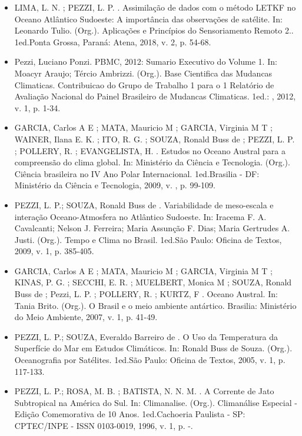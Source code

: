 \documentclass[11pt, a4paper]{awesome-cv}
\begin{document}
\begin{cvletter}

\begin{itemize}
  \item[] LIMA, L. N. ; PEZZI, L. P. . Assimilação de dados com o método LETKF no Oceano Atlântico 
  Sudoeste: A importância das observações de satélite. In: Leonardo Tulio. (Org.). Aplicações e
  Princípios do Sensoriamento Remoto 2.. 1ed.Ponta Grossa, Paraná: Atena, 2018, v. 2, p. 54-68. 

  \item[] Pezzi, Luciano Ponzi. PBMC, 2012: Sumario Executivo do Volume 1. In: Moacyr Araujo; 
  Tércio Ambrizzi. (Org.). Base Cientifica das Mudancas Climaticas. Contribuicao do Grupo de 
  Trabalho 1 para o 1 Relatório de Avaliação Nacional do Painel Brasileiro de Mudancas Climaticas. 
  1ed.: , 2012, v. 1, p. 1-34. 

  \item[] GARCIA, Carlos A E ; MATA, Mauricio M ; GARCIA, Virginia M T ; WAINER, Ilana E. K. ; 
  ITO, R. G. ; SOUZA, Ronald Buss de ; PEZZI, L. P. ; POLLERY, R. ; EVANGELISTA, H. . Estudos no 
  Oceano Austral para a compreensão do clima global. In: Ministério da Ciência e Tecnologia. 
  (Org.). Ciência brasileira no IV Ano Polar Internacional. 1ed.Brasilia - DF: Ministério da 
  Ciência e Tecnologia, 2009, v. , p. 99-109. 

  \item[] PEZZI, L. P.; SOUZA, Ronald Buss de . Variabilidade de meso-escala e 
  interação Oceano-Atmosfera no Atlântico Sudoeste. In: Iracema F. A. Cavalcanti; 
  Nelson J. Ferreira; Maria Assunção F. Dias; Maria Gertrudes A. Justi. (Org.). 
  Tempo e Clima no Brasil. 1ed.São Paulo: Oficina de Textos, 2009, v. 1, p. 385-405. 

  \item[] 
  GARCIA, Carlos A E ; MATA, Mauricio M ; GARCIA, Virginia M T ; KINAS, P. G. ; SECCHI, E. R. ; 
  MUELBERT, Monica M ; SOUZA, Ronald Buss de ; Pezzi, L. P. ; POLLERY, R. ; KURTZ, F . 
  Oceano Austral. In: Tania Brito. (Org.). O Brasil e o meio ambiente antártico. Brasilia: 
  Ministério do Meio Ambiente, 2007, v. 1, p. 41-49.

  \item[] PEZZI, L. P.; SOUZA, Everaldo Barreiro de . O Uso da Temperatura da Superfície do Mar 
  em Estudos Climáticos. In: Ronald Buss de Souza. (Org.). Oceanografia por Satélites. 
  1ed.São Paulo: Oficina de Textos, 2005, v. 1, p. 117-133. 

  \item[] PEZZI, L. P.; ROSA, M. B. ; BATISTA, N. N. M. . A Corrente de Jato Subtropical na 
  América do Sul. In: Climanalise. (Org.). Climanálise Especial - Edição Comemorativa de 
  10 Anos. 1ed.Cachoeria Paulista - SP: CPTEC/INPE - ISSN 0103-0019, 1996, v. 1, p. -. 
\end{itemize}


\end{cvletter}
\end{document}
